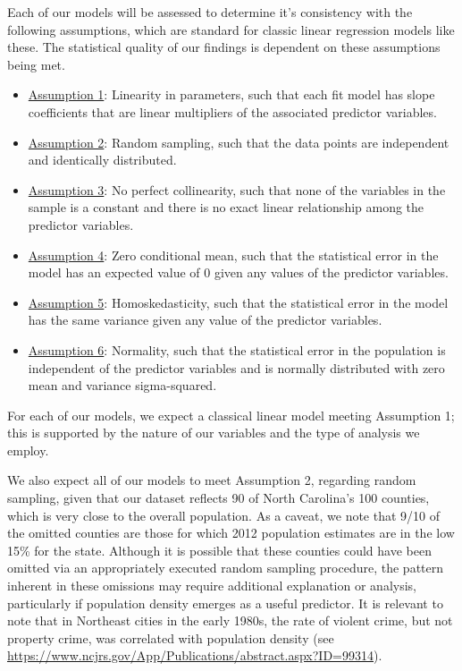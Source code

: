 \documentclass[]{article}
\begin{document}
Each of our models will be assessed to determine it's consistency with
the following assumptions, which are standard for classic linear
regression models like these. The statistical quality of our findings is
dependent on these assumptions being met.

\begin{itemize}
  \item \underline{Assumption 1}: Linearity in parameters, such that each fit model has slope coefficients that are linear multipliers of the associated predictor variables. 
  \item \underline{Assumption 2}: Random sampling, such that the data points are independent and identically distributed. 
  \item \underline{Assumption 3}: No perfect collinearity, such that none of the variables in the sample is a constant and there is no exact linear relationship among the predictor variables.
  \item \underline{Assumption 4}: Zero conditional mean, such that the statistical error in the model has an expected value of 0 given any values of the predictor variables.
  \item \underline{Assumption 5}: Homoskedasticity, such that the statistical error in the model has the same variance given any value of the predictor variables.
  \item \underline{Assumption 6}: Normality, such that the statistical error in the population is independent of the predictor variables and is normally distributed with zero mean and variance sigma-squared.
\end{itemize}

For each of our models, we expect a classical linear model meeting
Assumption 1; this is supported by the nature of our variables and the
type of analysis we employ.

We also expect all of our models to meet Assumption 2, regarding random
sampling, given that our dataset reflects 90 of North Carolina's 100
counties, which is very close to the overall population. As a caveat, we
note that 9/10 of the omitted counties are those for which 2012
population estimates are in the low 15\% for the state. Although it is
possible that these counties could have been omitted via an
appropriately executed random sampling procedure, the pattern inherent
in these omissions may require additional explanation or analysis,
particularly if population density emerges as a useful predictor. It is
relevant to note that in Northeast cities in the early 1980s, the rate
of violent crime, but not property crime, was correlated with population
density (see
\url{https://www.ncjrs.gov/App/Publications/abstract.aspx?ID=99314}).
\end{document}
